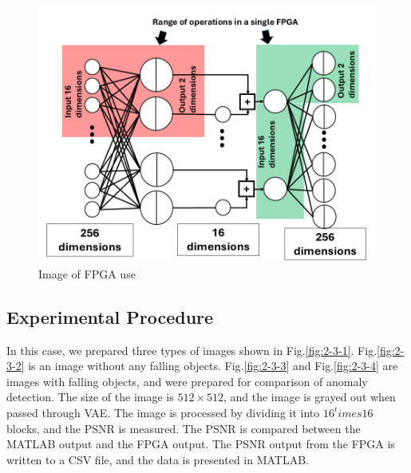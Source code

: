 \documentclass[conference]{IEEEtran}
\begin{document}
\begin{figure}[tb]
  \begin{center}
    \includegraphics[width=0.98\columnwidth]{figures/SoC_3.png}
  \end{center}
  \caption{Image of FPGA use}
  \label{fig:2-2-4-3}
\end{figure}

\subsection{Experimental Procedure}
In this case, we prepared three types of images shown in Fig.\ref{fig:2-3-1}.
Fig.\ref{fig:2-3-2} is an image without any falling objects.
Fig.\ref{fig:2-3-3} and Fig.\ref{fig:2-3-4} are images with falling objects, and were prepared for comparison of anomaly detection.
The size of the image is $512\times512$, and the image is grayed out when passed through VAE.
The image is processed by dividing it into $16^times16$ blocks, and the PSNR is measured.
The PSNR is compared between the MATLAB output and the FPGA output.
The PSNR output from the FPGA is written to a CSV file, and the data is presented in MATLAB.
\end{document}
